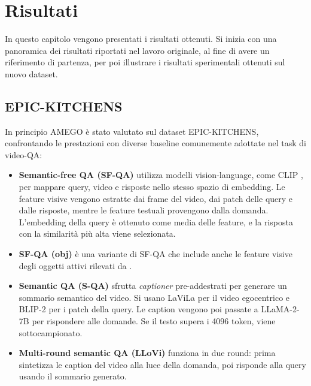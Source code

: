 \chapter{Risultati}
\label{chapter:Risultati}
In questo capitolo vengono presentati i risultati ottenuti. Si inizia con una panoramica dei risultati riportati nel lavoro originale, al fine di avere un riferimento di partenza, per poi illustrare i risultati sperimentali ottenuti sul nuovo dataset.
\section{EPIC-KITCHENS}
In principio AMEGO è stato valutato sul dataset EPIC-KITCHENS, confrontando le prestazioni con diverse baseline comunemente adottate nel task di video-QA:
\begin{itemize}
    \item \textbf{Semantic-free QA (SF-QA)} utilizza modelli vision-language, come CLIP \cite{radford2021learningtransferablevisualmodels}, per mappare query, video e risposte nello stesso spazio di embedding. Le feature visive vengono estratte dai frame del video, dai patch delle query e dalle risposte, mentre le feature testuali provengono dalla domanda. L'embedding della query è ottenuto come media delle feature, e la risposta con la similarità più alta viene selezionata.
    
    \item \textbf{SF-QA (obj)} è una variante di SF-QA che include anche le feature visive degli oggetti attivi rilevati da \cite{shan2020understandinghumanhandscontact}.
    
    \item \textbf{Semantic QA (S-QA)} sfrutta \emph{captioner} pre-addestrati per generare un sommario semantico del video. Si usano LaViLa \cite{zhao2022learningvideorepresentationslarge} per il video egocentrico e BLIP-2 \cite{li2023blip2bootstrappinglanguageimagepretraining} per i patch della query. Le caption vengono poi passate a LLaMA-2-7B \cite{touvron2023llama2openfoundation} per rispondere alle domande. Se il testo supera i 4096 token, viene sottocampionato.
    
    \item \textbf{Multi-round semantic QA (LLoVi)} \cite{zhang2024simplellmframeworklongrange} funziona in due round: prima sintetizza le caption del video alla luce della domanda, poi risponde alla query usando il sommario generato.
\end{itemize}

